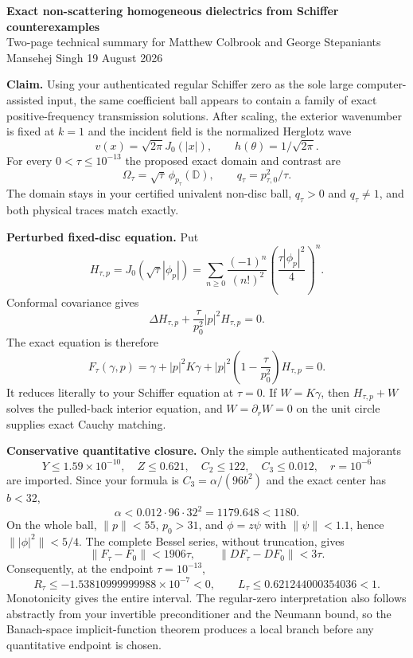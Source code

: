 \documentclass[10pt]{article}
\newcommand{\D}{\mathbb D}
\newcommand{\norm}[1]{\lVert#1\rVert}
\begin{document}
\begin{center}
{\Large\bfseries Exact non-scattering homogeneous dielectrics from Schiffer counterexamples}\\[3pt]
{\large Two-page technical summary for Matthew Colbrook and George Stepaniants}\\[2pt]
Mansehej Singh \hfill 19 August 2026
\end{center}

\textbf{Claim.}
Using your authenticated regular Schiffer zero as the sole large
computer-assisted input, the same coefficient ball appears to contain a
family of exact positive-frequency transmission solutions.  After scaling,
the exterior wavenumber is fixed at $k=1$ and the incident field is the
normalized Herglotz wave
\[
 v(x)=\sqrt{2\pi}J_0(|x|),\qquad h(\theta)=1/\sqrt{2\pi}.
\]
For every $0<\tau\le10^{-13}$ the proposed exact domain and contrast are
\[
 \Omega_\tau=\sqrt\tau\,\phi_{p_\tau}(\D),
 \qquad q_\tau=p_{\tau,0}^2/\tau.
\]
The domain stays in your certified univalent non-disc ball, $q_\tau>0$ and
$q_\tau\ne1$, and both physical traces match exactly.

\textbf{Perturbed fixed-disc equation.}
Put
\[
 H_{\tau,p}=J_0(\sqrt\tau|\phi_p|)
 =\sum_{n\ge0}\frac{(-1)^n}{(n!)^2}
   \left(\frac{\tau|\phi_p|^2}{4}\right)^n.
\]
Conformal covariance gives
\[
 \Delta H_{\tau,p}+\frac{\tau}{p_0^2}|p|^2H_{\tau,p}=0.
\]
The exact equation is therefore
\[
 F_\tau(\gamma,p)=
 \gamma+|p|^2K\gamma
 +|p|^2\left(1-\frac\tau{p_0^2}\right)H_{\tau,p}=0.
\]
It reduces literally to your Schiffer equation at $\tau=0$.  If
$W=K\gamma$, then $H_{\tau,p}+W$ solves the pulled-back interior equation,
and $W=\partial_rW=0$ on the unit circle supplies exact Cauchy matching.

\textbf{Conservative quantitative closure.}
Only the simple authenticated majorants
\[
Y\le1.59\!\times\!10^{-10},\quad Z\le0.621,
\quad C_2\le122,
\quad C_3\le0.012,
\quad r=10^{-6}
\]
are imported.  Since your formula is $C_3=\alpha/(96b^2)$ and the exact
center has $b<32$,
\[
 \alpha<0.012\cdot96\cdot32^2=1179.648<1180.
\]
On the whole ball, $\norm p<55$, $p_0>31$, and
$\phi=z\psi$ with $\norm\psi<1.1$, hence $\norm{|\phi|^2}<5/4$.
The complete Bessel series, without truncation, gives
\[
 \norm{F_\tau-F_0}<1906\tau,
 \qquad
 \norm{D F_\tau-D F_0}<3\tau.
\]
Consequently, at the endpoint $\tau=10^{-13}$,
\[
 R_\tau\le-1.53810999999988\times10^{-7}<0,
 \qquad
 L_\tau\le0.621244000354036<1.
\]
Monotonicity gives the entire interval.  The regular-zero interpretation also
follows abstractly from your invertible preconditioner and the Neumann bound,
so the Banach-space implicit-function theorem produces a local branch before
any quantitative endpoint is chosen.
\end{document}
